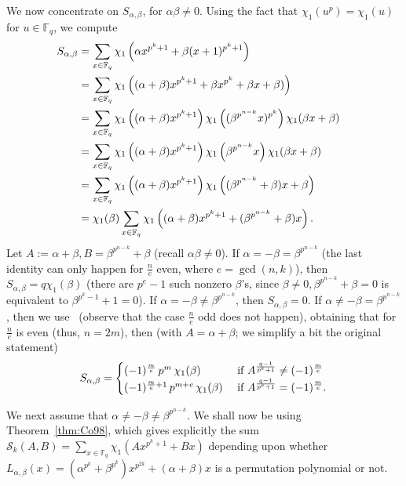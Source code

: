 \documentclass[11pt]{article}
\def\F{{\mathbb F}}
\def\\{\cr}
\begin{document}
We now  concentrate on $S_{\alpha,\beta}$, for $\alpha\beta\neq 0$. Using the fact that $\chi_1(u^p)=\chi_1(u)$ for $u\in\F_q$, we compute
\allowdisplaybreaks
\begin{align*}
S_{\alpha,\beta}
&=\sum_{x\in \F_q} \chi_1\left(\alpha x^{p^k+1}+\beta(x+1)^{p^k+1}\right)\\
&=\sum_{x\in \F_q} \chi_1\left((\alpha+\beta)  x^{p^k+1}+ \beta x^{p^k} +\beta x+\beta)\right)\\
&=\sum_{x\in \F_q} \chi_1\left((\alpha+\beta)  x^{p^k+1}\right) \chi_1\left( (\beta^{p^{n-k}} x)^{p^k}\right)\chi_1( \beta x+\beta)\\
&=\sum_{x\in \F_q} \chi_1\left((\alpha+\beta)  x^{p^k+1}\right) \chi_1\left( \beta^{p^{n-k}} x\right)\chi_1( \beta x+\beta)\\
&=\sum_{x\in \F_q} \chi_1\left((\alpha+\beta)  x^{p^k+1}\right) \chi_1\left( (\beta^{p^{n-k}} +\beta) x+\beta\right)\\
&=\chi_1(\beta) \sum_{x\in \F_q} \chi_1\left((\alpha+\beta)  x^{p^k+1}+ (\beta^{p^{n-k}} +\beta) x\right).
\end{align*}
Let  $A:=\alpha+\beta, B=\beta^{p^{n-k}}+\beta$ (recall $\alpha\beta\neq 0$). 
If $\alpha=-\beta=\beta^{p^{n-k}}$ (the last identity can only happen for  $\frac{n}{e}$ even, where $e=\gcd(n,k)$), then  $S_{\alpha,\beta}=q\chi_1(\beta)$ (there are $p^e-1$ such nonzero $\beta$'s, since $\beta\neq 0,\beta^{p^{n-k}}+\beta=0$ is equivalent to $\beta^{p^k-1}+1=0$). If $\alpha=-\beta\neq \beta^{p^{n-k}}$, then $S_{\alpha,\beta}=0$. If   $\alpha\neq -\beta= \beta^{p^{n-k}}$, then we  use~\cite[Theorem 1 and 2]{Co98_1} (observe that the case $\frac{n}{e}$ odd does not happen), obtaining that for  $\frac{n}{e}$ is even (thus, $n=2m$), then  (with $A=\alpha+\beta$; we simplify a bit the original statement)
 \[
S_{\alpha,\beta}=
\begin{cases}
 (-1)^{\frac{m}{e}}\, p^m\,\chi_1(\beta) &\text{ if } A^{\frac{q-1}{p^e+1}}\neq (-1)^{\frac{m}{e}}\\ 
 (-1)^{\frac{m}{e}+1}\, p^{m+e}\,\chi_1(\beta) &\text{ if } A^{\frac{q-1}{p^e+1}}= (-1)^{\frac{m}{e}}. 
\end{cases}
\]


We next assume that $\alpha\neq -\beta\neq \beta^{p^{n-k}}$.
We shall now be using Theorem~\ref{thm:Co98},
which gives explicitly the sum $\mathscr{S}_k(A,B)=\sum_{x\in \F_q} \chi_1\left(A x^{p^k+1}+ B x\right)$ depending upon whether $L_{\alpha,\beta}(x)=(\alpha^{p^k}+\beta^{p^k}) x^{p^{2k}}+(\alpha+\beta)x$  is a permutation polynomial or not. 
\end{document}
